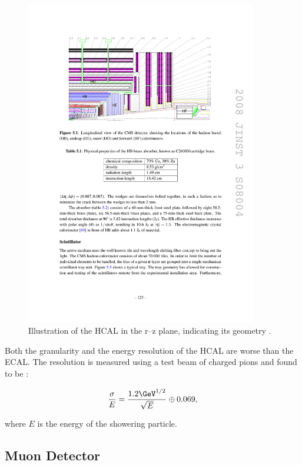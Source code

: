 \begin{figure}[htbp]
   \includegraphics[width=0.9\textwidth]{plots/detector/hcal_layout.pdf}
\caption{Illustration of the \ac{HCAL} in the r--z plane, indicating its geometry \cite{Chatrchyan:2008aa}.}
\label{fig:hcal}
\end{figure}

Both the granularity and the energy resolution of the \ac{HCAL} are worse than
the \ac{ECAL}. The resolution is measured using a test beam of charged pions and
found to be \cite{Chatrchyan:2008aa}:

\begin{equation}
\frac{\sigma}{E} = \frac{1.2\GeV^{1/2}}{\sqrt{E}} \oplus 0.069,
\end{equation}

where $E$ is the energy of the showering particle. 

\subsection{Muon Detector}
\label{sec:muondetector}

